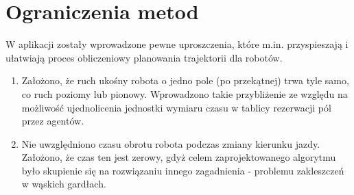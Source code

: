 \section{Ograniczenia metod}
W aplikacji zostały wprowadzone pewne uproszczenia, które m.in. przyspieszają i ułatwiają proces obliczeniowy planowania trajektorii dla robotów.
\begin{enumerate}
	\item Założono, że ruch ukośny robota o jedno pole (po przekątnej) trwa tyle samo, co ruch poziomy lub pionowy. Wprowadzono takie przybliżenie ze względu na możliwość ujednolicenia jednostki wymiaru czasu w tablicy rezerwacji pól przez agentów.
	\item Nie uwzględniono czasu obrotu robota podczas zmiany kierunku jazdy. Założono, że czas ten jest zerowy, gdyż celem zaprojektowanego algorytmu było skupienie się na rozwiązaniu innego zagadnienia - problemu zakleszczeń w wąskich gardłach.
\end{enumerate}
